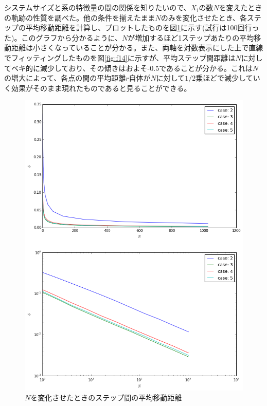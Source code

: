 システムサイズと系の特徴量の間の関係を知りたいので、$X_{i}$の数$N$を変えたときの軌跡の性質を調べた。他の条件を揃えたまま$N$のみを変化させたとき、各ステップの平均移動距離を計算し、プロットしたものを図\ref{fig:f13}に示す(試行は100回行った)。このグラフから分かるように、$N$が増加するほど1ステップあたりの平均移動距離は小さくなっていることが分かる。また、両軸を対数表示にした上で直線でフィッティングしたものを図\ref{fig:f14}に示すが、平均ステップ間距離は$N$に対してベキ的に減少しており、その傾きはおよそ-0.5であることが分かる。これは$N$の増大によって、各点の間の平均距離$r$自体が$N$に対して$1/2$乗ほどで減少していく効果がそのまま現れたものであると見ることができる。
\begin{figure}[H]
    \begin{center}
        \includegraphics[width=12.5cm]{../img/simple3_N_2.png}
        \caption{$N$を変化させたときのステップ間の平均移動距離}
        \label{fig:f13}
    \end{center}
\end{figure}

